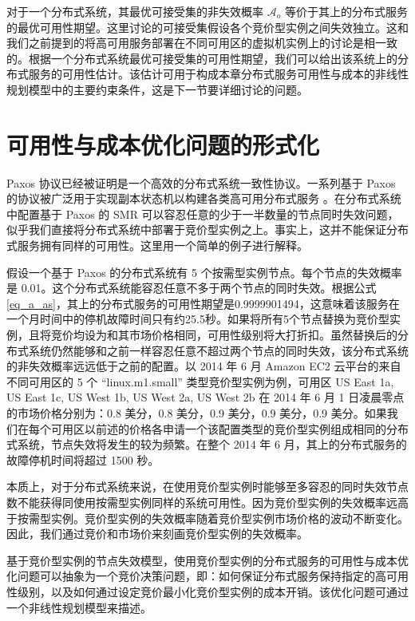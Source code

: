 对于一个分布式系统，其最优可接受集的非失效概率 $\mathcal{A}_{o}$ 等价于其上的分布式服务的最优可用性期望。这里讨论的可接受集假设各个竞价型实例之间失效独立。这和我们之前提到的将高可用服务部署在不同可用区的虚拟机实例上的讨论是相一致的。根据一个分布式系统最优可接受集的可用性期望，我们可以给出该系统上的分布式服务的可用性估计。该估计可用于构成本章分布式服务可用性与成本的非线性规划模型中的主要约束条件，这是下一节要详细讨论的问题。

\section{可用性与成本优化问题的形式化}
\label{jupiter-formulation}
Paxos \cite{lamport2001paxos}协议已经被证明是一个高效的分布式系统一致性协议。一系列基于 Paxos 的协议被广泛用于实现副本状态机以构建各类高可用分布式服务 \cite{Bolosky:2011:PRS:1972457.1972472, Burrows:2006:CLS:1298455.1298487, Mu:2014:PME:2600212.2600218}。在分布式系统中配置基于 Paxos 的 SMR 可以容忍任意的少于一半数量的节点同时失效问题，似乎我们直接将分布式系统中部署于竞价型实例之上。事实上，这并不能保证分布式服务拥有同样的可用性。这里用一个简单的例子进行解释。

假设一个基于 Paxos 的分布式系统有 5 个按需型实例节点。每个节点的失效概率是 0.01。这个分布式系统能容忍任意不多于两个节点的同时失效。根据公式\eqref{eq_a_as}，其上的分布式服务的可用性期望是0.9999901494，这意味着该服务在一个月时间中的停机故障时间只有约25.5秒。如果将所有5个节点替换为竞价型实例，且将竞价均设为和其市场价格相同，可用性级别将大打折扣。虽然替换后的分布式系统仍然能够和之前一样容忍任意不超过两个节点的同时失效，该分布式系统的非失效概率远远低于之前的配置。以 2014 年 6 月 Amazon EC2 云平台的来自不同可用区的 5 个 ``linux.m1.small'' 类型竞价型实例为例，可用区 US East 1a, US East 1c, US West 1b, US West 2a, US West 2b 在 2014 年 6 月 1 日凌晨零点的市场价格分别为：0.8 美分，0.8 美分，0.9 美分，0.9 美分，0.9 美分。如果我们在每个可用区以前述的价格各申请一个该配置类型的竞价型实例组成相同的分布式系统，节点失效将发生的较为频繁。在整个 2014 年 6 月，其上的分布式服务的故障停机时间将超过 1500 秒。

本质上，对于分布式系统来说，在使用竞价型实例时能够至多容忍的同时失效节点数不能获得同使用按需型实例同样的系统可用性。因为竞价型实例的失效概率远高于按需型实例。竞价型实例的失效概率随着竞价型实例市场价格的波动不断变化。因此，我们通过竞价和市场价来刻画竞价型实例的失效概率。

基于竞价型实例的节点失效模型，使用竞价型实例的分布式服务的可用性与成本优化问题可以抽象为一个竞价决策问题，即：如何保证分布式服务保持指定的高可用性级别，以及如何通过设定竞价最小化竞价型实例的成本开销。该优化问题可通过一个非线性规划模型来描述。

